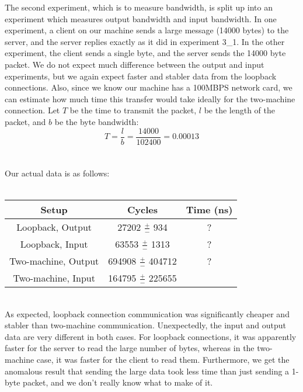 \noindent The second experiment, which is to measure bandwidth, is split up into an experiment which measures output bandwidth and input bandwidth. In one experiment, a client on our machine sends a large message (14000 bytes) to the server, and the server replies exactly as it did in experiment 3\_1. In the other experiment, the client sends a single byte, and the server sends the 14000 byte packet. We do not expect much difference between the output and input experiments, but we again expect faster and stabler data from the loopback connections. Also, since we know our machine has a 100MBPS network card, we can estimate how much time this transfer would take ideally for the two-machine connection. Let $T$ be the time to transmit the packet, $l$ be the length of the packet, and $b$ be the byte bandwidth:
\[
T = \frac{l}{b} = \frac{14000}{102400} = 0.00013
\]
\\
\\
Our actual data is as follows:
\\
\\
\begin{tabular}{|c|c|c|}
\hline
\textbf{Setup} & \textbf{Cycles} & \textbf{Time (ns)}\\\hline
Loopback, Output & 27202 $\frac{+}{-}$ 934 & ? \\\hline
Loopback, Input & 63553 $\frac{+}{-}$ 1313 & ? \\\hline
Two-machine, Output & 694908 $\frac{+}{-}$ 404712 & ? \\\hline
Two-machine, Input & 164795 $\frac{+}{-}$ 225655 & \\\hline
\end{tabular}
~\\

\noindent As expected, loopback connection communication was significantly cheaper and stabler than two-machine communication. Unexpectedly, the input and output data are very different in both cases. For loopback connections, it was apparently faster for the server to read the large number of bytes, whereas in the two-machine case, it was faster for the client to read them. Furthermore, we get the anomalous result that sending the large data took less time than just sending a 1-byte packet, and we don't really know what to make of it.